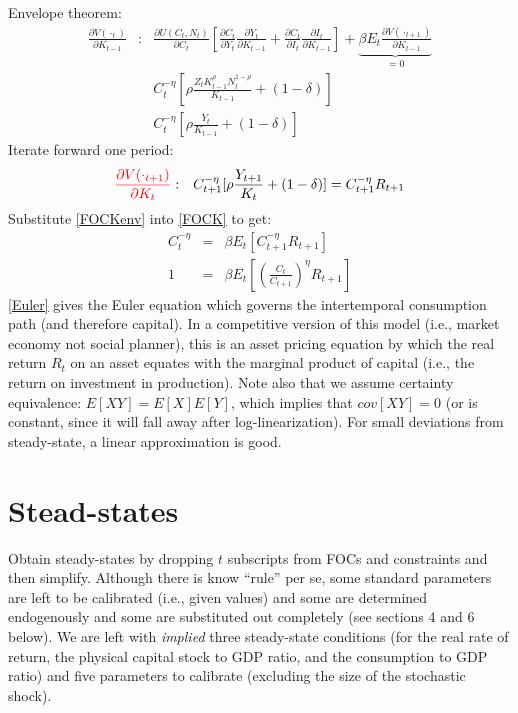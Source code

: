 Envelope theorem:
\begin{eqnarray}
\frac{\partial{V(\cdot_{t})}}{\partial{K_{t-1}}} &:&  \frac{\partial U(C_t,N_t)}{\partial C_t} \left[ \frac{\partial C_t}{\partial Y_t}\frac{\partial Y_t}{\partial K_{t-1}} + \frac{\partial C_t}{\partial I_t}\frac{\partial I_t}{\partial K_{t-1}}  \right] + \underset{=0}{\underbrace{\beta{E_t}\frac{\partial{V(\cdot_{t+1})}}{\partial{K_{t-1}}}}} \\ 
&& C_{t}^{-\eta} \left[ \rho \frac{Z_{t}K_{t-1}^{\rho}N_t^{1-\rho}}{K_{t-1}} + (1-\delta) \right]   \\ 
&& C_{t}^{-\eta} [ \rho \frac{Y_t}{K_{t-1}} + (1-\delta) ]   
\end{eqnarray}
Iterate forward one period:
\begin{eqnarray} \label{FOCKenv}
{\color{red}{ \frac{\partial{V(\cdot_{t+1})}}{\partial{K_{t}}} }} &:& C_{t+1}^{-\eta} [ \rho \frac{Y_{t+1}}{K_{t}} + (1-\delta) ] = C_{t+1}^{-\eta} R_{t+1}  
\end{eqnarray}
Substitute \eqref{FOCKenv} into \eqref{FOCK} to get:
\begin{eqnarray} \nonumber
C_{t}^{-\eta} &=& \beta {E_t} \left[ C_{t+1}^{-\eta} R_{t+1} \right ]  \\ \label{Euler}
1 &=& \beta {E_t} \left[ \left(\frac{C_{t}}{C_{t+1}}\right)^{\eta} R_{t+1} \right ]
\end{eqnarray}
\eqref{Euler} gives the Euler equation which governs the intertemporal consumption path (and therefore capital).  In a competitive version of this model (i.e., market economy not social planner), this is an asset pricing equation by which the real return $R_t$ on an asset equates with the marginal product of capital (i.e., the return on investment in production). Note also that we assume certainty equivalence: $E[X Y] = E[X]E[Y]$, which implies that $cov[XY]=0$ (or is constant, since it will fall away after log-linearization). For small deviations from steady-state, a linear approximation is good. 


\section{Stead-states}
Obtain steady-states by dropping $t$ subscripts from FOCs and constraints and then simplify. Although there is know ``rule'' per se, some standard parameters are left to be calibrated (i.e., given values) and some are determined endogenously and some are substituted out completely (see sections 4 and 6 below). We are left with \textit{implied} three steady-state conditions (for the real rate of return, the physical capital stock to GDP ratio, and the consumption to GDP ratio) and five parameters to calibrate (excluding the size of the stochastic shock).

